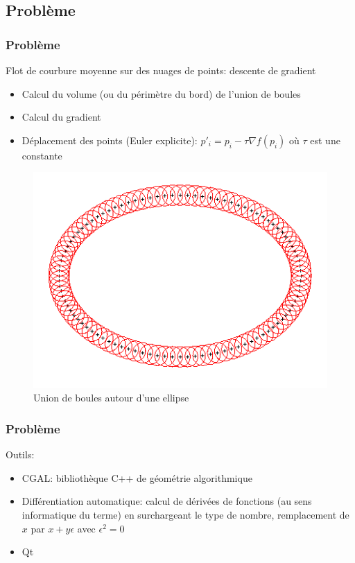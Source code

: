 \documentclass{beamer}
\begin{document}
\subsection{Problème}
\begin{frame}
    \frametitle{Problème}

    Flot de courbure moyenne sur des nuages de points: descente de gradient
    \begin{itemize}
        \item Calcul du volume (ou du périmètre du bord) de l'union de boules
        \item Calcul du gradient
        \item Déplacement des points (Euler explicite): $ p'_i = p_i - \tau \nabla f (p_i) $ où $
            \tau $ est une constante
    \end{itemize}

    \begin{figure}
        \centering
        \includegraphics[scale=0.28]{img/ellipse-balls-15}
        \caption{Union de boules autour d'une ellipse}
    \end{figure}
\end{frame}

\begin{frame}
    \frametitle{Problème}

    Outils:
    \begin{itemize}
        \item CGAL: bibliothèque C++ de géométrie algorithmique
        \item Différentiation automatique: calcul de dérivées de fonctions (au
            sens informatique du terme) en surchargeant le type de nombre,
            remplacement de $ x $ par $ x + y\epsilon $ avec $ \epsilon^2 = 0 $
        \item Qt
    \end{itemize}
\end{frame}
\end{document}

